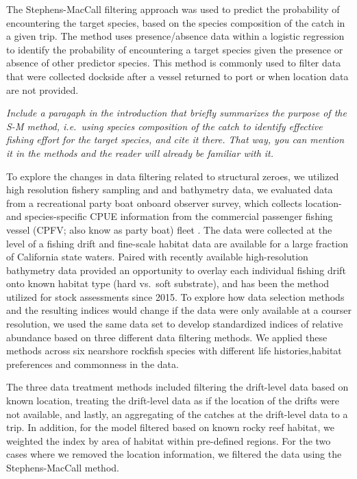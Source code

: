 \documentclass[
  12pt,
  authoryear,
  preprint,
  3p]{elsarticle}
\begin{document}
The Stephens-MacCall \citeyearpar{Stephens:2004:MAS} filtering approach
was used to predict the probability of encountering the target species,
based on the species composition of the catch in a given trip. The
method uses presence/absence data within a logistic regression to
identify the probability of encountering a target species given the
presence or absence of other predictor species. This method is commonly
used to filter data that were collected dockside after a vessel returned
to port or when location data are not provided.

\emph{Include a paragaph in the introduction that briefly summarizes the
purpose of the S-M method, i.e.~using species composition of the catch
to identify effective fishing effort for the target species, and cite it
there. That way, you can mention it in the methods and the reader will
already be familiar with it.}

To explore the changes in data filtering related to structural zeroes,
we utilized high resolution fishery sampling and and bathymetry data, we
evaluated data from a recreational party boat onboard observer survey,
which collects location- and species-specific CPUE information from the
commercial passenger fishing vessel (CPFV; also know as party boat)
fleet \citep{Monk:2014:DRD}. The data were collected at the level of a
fishing drift and fine-scale habitat data are available for a large
fraction of California state waters. Paired with recently available
high-resolution bathymetry data provided an opportunity to overlay each
individual fishing drift onto known habitat type (hard vs.~soft
substrate), and has been the method utilized for stock assessments since
2015. To explore how data selection methods and the resulting indices
would change if the data were only available at a courser resolution, we
used the same data set to develop standardized indices of relative
abundance based on three different data filtering methods. We applied
these methods across six nearshore rockfish species with different life
histories,habitat preferences and commonness in the data.

The three data treatment methods included filtering the drift-level data
based on known location, treating the drift-level data as if the
location of the drifts were not available, and lastly, an aggregating of
the catches at the drift-level data to a trip. In addition, for the
model filtered based on known rocky reef habitat, we weighted the index
by area of habitat within pre-defined regions. For the two cases where
we removed the location information, we filtered the data using the
Stephens-MacCall method.
\end{document}
